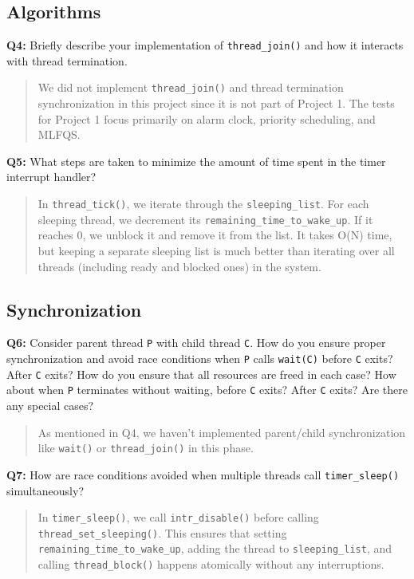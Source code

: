 \documentclass[a4paper,11pt]{paper}
\begin{document}
\subsection{Algorithms}


\textbf{Q4:} Briefly describe your implementation of \texttt{thread\_join()} and
how it interacts with thread termination.

\begin{quote}
  We did not implement \texttt{thread\_join()} and thread termination synchronization in this project since it is not part of Project 1. The tests for Project 1 focus primarily on alarm clock, priority scheduling, and MLFQS.
\end{quote}

\textbf{Q5:} What steps are taken to minimize the amount of time spent in the
timer interrupt handler?

\begin{quote}
  In \texttt{thread\_tick()}, we iterate through the \texttt{sleeping\_list}. For each sleeping thread, we decrement its \texttt{remaining\_time\_to\_wake\_up}. If it reaches 0, we unblock it and remove it from the list. It takes O(N) time, but keeping a separate sleeping list is much better than iterating over all threads (including ready and blocked ones) in the system.
\end{quote}


\subsection{Synchronization}

\textbf{Q6:} Consider parent thread \texttt{P} with child thread \texttt{C}.
How do you ensure proper synchronization and avoid race conditions when
\texttt{P} calls \texttt{wait(C)} before \texttt{C} exits?  After \texttt{C}
exits?  How do you ensure that all resources are freed in each case?  How about
when \texttt{P} terminates without waiting, before \texttt{C} exits?  After
\texttt{C} exits?  Are there any special cases?

\begin{quote}
  As mentioned in Q4, we haven't implemented parent/child synchronization like \texttt{wait()} or \texttt{thread\_join()} in this phase.
\end{quote}

\textbf{Q7:} How are race conditions avoided when multiple threads call
\texttt{timer\_sleep()} simultaneously?

\begin{quote}
  In \texttt{timer\_sleep()}, we call \texttt{intr\_disable()} before calling \texttt{thread\_set\_sleeping()}. This ensures that setting \texttt{remaining\_time\_to\_wake\_up}, adding the thread to \texttt{sleeping\_list}, and calling \texttt{thread\_block()} happens atomically without any interruptions.
\end{quote}
\end{document}
